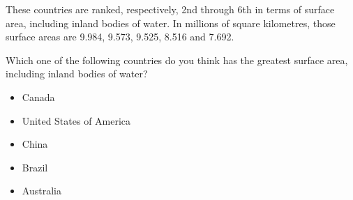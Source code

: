 These countries are ranked, respectively, 2nd through 6th in terms of surface area, including inland bodies of water.
In millions of square kilometres, those surface areas are 9.984, 9.573, 9.525, 8.516 and 7.692.

\begin{tcolorbox}
Which one of the following countries do you think has the greatest surface area, including inland bodies of water?
	
\begin{itemize}
	\setlength\itemsep{-5pt}
	\item Canada
	\item United States of America
	\item China
	\item Brazil
	\item Australia
\end{itemize}
\end{tcolorbox}
